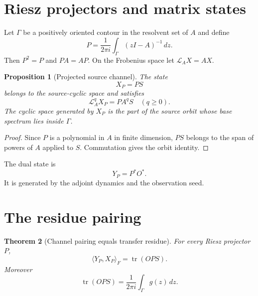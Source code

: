 \documentclass[12pt]{article}
\newtheorem{theorem}{Theorem}[section]
\newtheorem{proposition}[theorem]{Proposition}
\theoremstyle{remark}
\newcommand{\cL}{\mathcal L}
\begin{document}
\section{Riesz projectors and matrix states}

Let $\Gamma$ be a positively oriented contour in the resolvent set of $A$
and define
\begin{equation}\label{eq:riesz}
 P=\frac{1}{2\pi i}\int_\Gamma(zI-A)^{-1}\,dz.
\end{equation}
Then $P^2=P$ and $PA=AP$.  On the Frobenius space let
$\cL_AX=AX$.

\begin{proposition}[Projected source channel]\label{prop:source-channel}
The state
\begin{equation}\label{eq:right-state}
 X_P=PS
\end{equation}
belongs to the source-cyclic space and satisfies
\begin{equation}\label{eq:right-channel-action}
 \cL_A^qX_P=P A^qS
 \quad(q\ge0).
\end{equation}
The cyclic space generated by $X_P$ is the part of the source orbit whose
base spectrum lies inside $\Gamma$.
\end{proposition}

\begin{proof}
Since $P$ is a polynomial in $A$ in finite dimension, $PS$ belongs to the
span of powers of $A$ applied to $S$.  Commutation gives the orbit identity.
\end{proof}

The dual state is
\begin{equation}\label{eq:left-state}
 Y_P=P^*O^*.
\end{equation}
It is generated by the adjoint dynamics and the observation seed.

\section{The residue pairing}

\begin{theorem}[Channel pairing equals transfer residue]\label{thm:residue}
For every Riesz projector $P$,
\begin{equation}\label{eq:pairing-residue}
 \boxed{
 \langle Y_P,X_P\rangle_F
 =\operatorname{tr}(OPS).
 }
\end{equation}
Moreover
\begin{equation}\label{eq:contour-residue}
 \operatorname{tr}(OPS)
 =\frac{1}{2\pi i}\int_\Gamma g(z)\,dz.
\end{equation}
\end{theorem}
\end{document}
